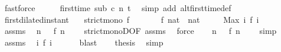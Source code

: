 \begin{isabellebody}
\ fastforce\isanewline
\ \ \isamarkupfalse%
\ \isamarkupfalse%
\ {\isacartoucheopen}first{\isacharunderscore}time\ sub\ c\ n\ t{\isacartoucheclose}\ \isamarkupfalse%
\ {\isacharparenleft}simp\ add{\isacharcolon}\ alt{\isacharunderscore}first{\isacharunderscore}time{\isacharunderscore}def{\isacharparenright}\isanewline
{}\isamarkupfalse%
%
\endisatagproof
{\isafoldproof}%
%
\isadelimproof
\isanewline
%
\endisadelimproof
\isanewline
{}\isamarkupfalse%
\ first{\isacharunderscore}dilated{\isacharunderscore}instant{\isacharcolon}\isanewline
\ \ \ {\isacartoucheopen}strict{\isacharunderscore}mono\ f{\isacartoucheclose}\isanewline
\ \ \ \ \ \ \ {\isacartoucheopen}f\ {\isacharparenleft}{}{\isacharcolon}{\isacharcolon}nat{\isacharparenright}\ {\isacharequal}\ {\isacharparenleft}{}{\isacharcolon}{\isacharcolon}nat{\isacharparenright}{\isacartoucheclose}\isanewline
\ \ \ \ \ {\isacartoucheopen}Max\ {\isacharbraceleft}i{\isachardot}\ f\ i\ {\isasymle}\ {}{\isacharbraceright}\ {\isacharequal}\ {}{\isacartoucheclose}\isanewline
%
\isadelimproof
%
\endisadelimproof
%
\isatagproof
{}\isamarkupfalse%
\ {\isacharminus}\isanewline
\ \ \isamarkupfalse%
\ assms{\isacharparenleft}{}{\isacharparenright}\ \isamarkupfalse%
\ {\isacartoucheopen}{\isasymforall}n\ {\isachargreater}\ {}{\isachardot}\ f\ n\ {\isachargreater}\ {}{\isacartoucheclose}\ \isamarkupfalse%
\ strict{\isacharunderscore}monoD{\isacharbrackleft}OF\ assms{\isacharparenleft}{}{\isacharparenright}{\isacharbrackright}\ \isamarkupfalse%
\ force\isanewline
\ \ \isamarkupfalse%
\ {\isacartoucheopen}{\isasymforall}n\ {\isasymnoteq}\ {}{\isachardot}\ {\isasymnot}{\isacharparenleft}f\ n\ {\isasymle}\ {}{\isacharparenright}{\isacartoucheclose}\ \isamarkupfalse%
\ simp\isanewline
\ \ \isamarkupfalse%
\ assms{\isacharparenleft}{}{\isacharparenright}\ \isamarkupfalse%
\ {\isacartoucheopen}{\isacharbraceleft}i{\isachardot}\ f\ i\ {\isasymle}\ {}{\isacharbraceright}\ {\isacharequal}\ {\isacharbraceleft}{}{\isacharbraceright}{\isacartoucheclose}\ \isamarkupfalse%
\ blast\isanewline
\ \ \isamarkupfalse%
\ {\isacharquery}thesis\ \isamarkupfalse%
\ simp\isanewline

\end{isabellebody}
